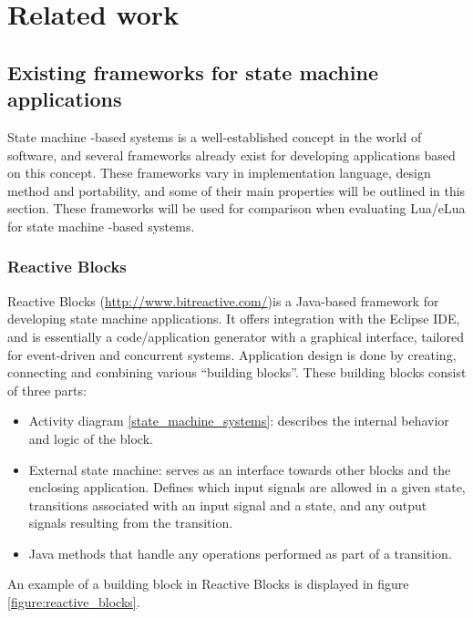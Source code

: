 \chapter{Related work}
\label{ch:related_work}

\section{Existing frameworks for state machine applications}
State machine -based systems is a well-established concept in the world of software, and several frameworks already exist for developing applications based on this concept. These frameworks vary in implementation language, design method and portability, and some of their main properties will be outlined in this section. These frameworks will be used for comparison when evaluating Lua/eLua for state machine -based systems.

\subsection{Reactive Blocks}
Reactive Blocks (\url{http://www.bitreactive.com/})is a Java-based framework for developing state machine applications. It offers integration with the Eclipse IDE, and is essentially a code/application generator with a graphical interface, tailored for event-driven and concurrent systems. Application design is done by creating, connecting and combining various “building blocks”. These building blocks consist of three parts:
\begin{itemize}
	\item Activity diagram \ref{state_machine_systems}: describes the internal behavior and logic of the block.
	\item External state machine: serves as an interface towards other blocks and the enclosing application. Defines which input signals are allowed in a given state, transitions associated with an input signal and a state, and any output signals resulting from the transition.
	\item Java methods that handle any operations performed as part of a transition.
\end{itemize}

An example of a building block in Reactive Blocks is displayed in figure \ref{figure:reactive_blocks}.

